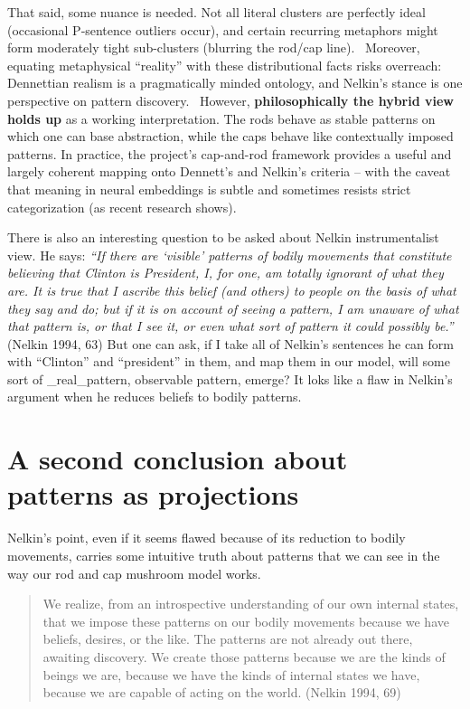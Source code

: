 \documentclass[12pt]{article}
\begin{document}
That said, some nuance is needed. Not all literal clusters are perfectly ideal (occasional P‑sentence outliers occur), and certain recurring metaphors might form moderately tight sub-clusters (blurring the rod/cap line).~ Moreover, equating metaphysical ``reality'' with these distributional facts risks overreach: Dennettian realism is a pragmatically minded ontology, and Nelkin's stance is one perspective on pattern discovery.~ However, \textbf{philosophically the hybrid view holds up} as a working interpretation. The rods behave as stable patterns on which one can base abstraction, while the caps behave like contextually imposed patterns. In practice, the project's cap-and-rod framework provides a useful and largely coherent mapping onto Dennett's and Nelkin's criteria -- with the caveat that meaning in neural embeddings is subtle and sometimes resists strict categorization (as recent research shows).

There is also an interesting question to be asked about Nelkin instrumentalist view. He says: \emph{``If there are `visible' patterns of bodily movements that constitute believing that Clinton is President, I, for one, am totally ignorant of what they are. It is true that I ascribe this belief (and others) to people on the basis of what they say and do; but if it is on account of seeing a pattern, I am unaware of what that pattern is, or that I see it, or even what sort of pattern it could possibly be.''} (Nelkin 1994, 63) But one can ask, if I take all of Nelkin's sentences he can form with ``Clinton'' and ``president'' in them, and map them in our model, will some sort of \_real\_pattern, observable pattern, emerge? It loks like a flaw in Nelkin's argument when he reduces beliefs to bodily patterns.

\section{A second conclusion about patterns as projections}\label{a-second-conclusion-about-patterns-as-projections}

Nelkin's point, even if it seems flawed because of its reduction to bodily movements, carries some intuitive truth about patterns that we can see in the way our rod and cap mushroom model works.

\begin{quote}
We realize, from an introspective understanding of our own internal states, that we impose these patterns on our bodily movements because we have beliefs, desires, or the like. The patterns are not already out there, awaiting discovery. We create those patterns because we are the kinds of beings we are, because we have the kinds of internal states we have, because we are capable of acting on the world. (Nelkin 1994, 69)
\end{quote}
\end{document}
